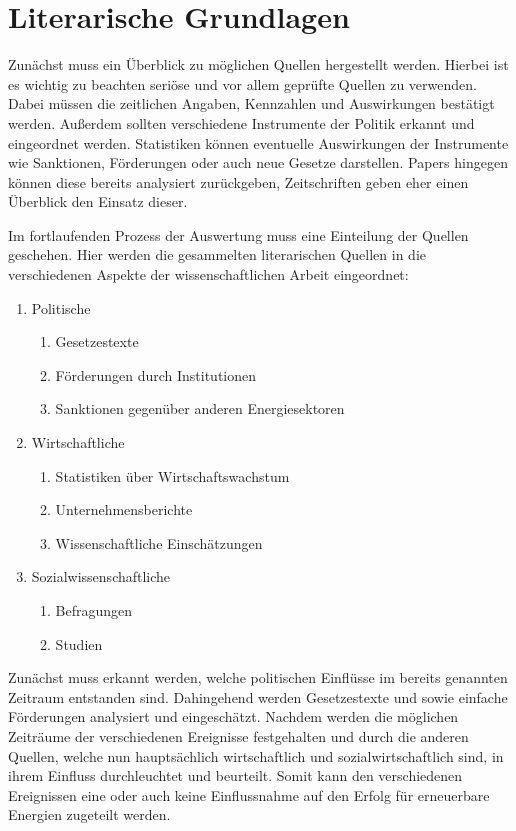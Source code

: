 \documentclass[12pt,a4paper]{article}
\begin{document}
\section*{Literarische Grundlagen}
Zunächst muss ein Überblick zu möglichen Quellen hergestellt werden. 
Hierbei ist es wichtig zu beachten seriöse und vor allem geprüfte Quellen zu verwenden. 
Dabei müssen die zeitlichen Angaben, Kennzahlen und Auswirkungen bestätigt werden. 
Außerdem sollten verschiedene Instrumente der Politik erkannt und eingeordnet werden. 
Statistiken können eventuelle Auswirkungen der Instrumente wie Sanktionen, Förderungen oder 
auch neue Gesetze darstellen. Papers hingegen können diese bereits analysiert zurückgeben, 
Zeitschriften geben eher einen Überblick den Einsatz dieser.

Im fortlaufenden Prozess der Auswertung muss eine Einteilung der Quellen geschehen. 
Hier werden die gesammelten literarischen Quellen in die verschiedenen Aspekte der 
wissenschaftlichen Arbeit eingeordnet: 

\begin{enumerate}
	\item Politische
	\begin{enumerate}
		\item Gesetzestexte
		\item Förderungen durch Institutionen
		\item Sanktionen gegenüber anderen Energiesektoren 
	\end{enumerate}
	\item Wirtschaftliche
	\begin{enumerate}
		\item Statistiken über Wirtschaftswachstum 
		\item Unternehmensberichte
		\item Wissenschaftliche Einschätzungen 
	\end{enumerate}
	\item Sozialwissenschaftliche
	\begin{enumerate}
		\item Befragungen
		\item Studien
	\end{enumerate}
\end{enumerate}

Zunächst muss erkannt werden, welche politischen Einflüsse im bereits genannten Zeitraum 
entstanden sind. Dahingehend werden Gesetzestexte und sowie einfache Förderungen analysiert 
und eingeschätzt. Nachdem werden die möglichen Zeiträume der verschiedenen Ereignisse 
festgehalten und durch die anderen Quellen, welche nun hauptsächlich wirtschaftlich und 
sozialwirtschaftlich sind, in ihrem Einfluss durchleuchtet und beurteilt. 
Somit kann den verschiedenen Ereignissen eine oder auch keine Einflussnahme auf den Erfolg 
für erneuerbare Energien zugeteilt werden. 
\end{document}
